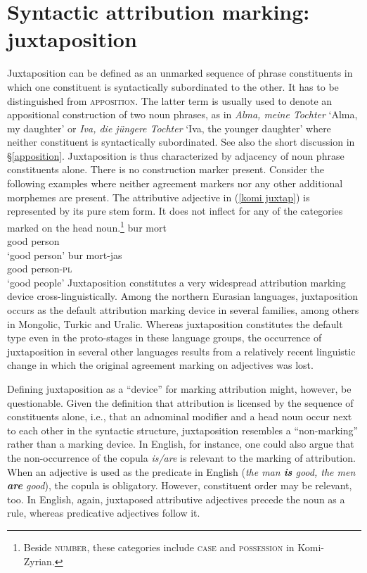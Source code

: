 \section[Juxtaposition]{Syntactic attribution marking: juxtaposition}
\label{juxtaposition}
Juxtaposition can be defined as an unmarked sequence of phrase constituents in which one constituent is syntactically subordinated to the other. It has to be distinguished from \textsc{apposition}. The latter term is usually used to denote an appositional construction of two noun phrases, as in \textit{Alma, meine Tochter} ‘Alma, my daughter’ or \textit{Iva, die jüngere Tochter} ‘Iva, the younger daughter’ where neither constituent is syntactically subordinated. See also the short discussion in \S\ref{apposition}. Juxtaposition is thus characterized by adjacency of noun phrase constituents alone. There is no construction marker present. Consider the following  examples where neither agreement markers nor any other additional morphemes are present. The attributive adjective in (\ref{komi juxtap}) is represented by its pure stem form. It does not inflect for any of the categories marked on the head noun.\footnote{Beside \textsc{number}, these categories include \textsc{case} and \textsc{possession} in Komi-Zyrian.}
\ea
\label{komi juxtap}
\ea
\gll 	bur 	mort\\
		good	person\\
\glt		‘good person’
\ex
\gll 	bur	mort-jas\\
		good	person-\textsc{pl}\\
\glt		‘good people’
\z
\z
Juxtaposition constitutes a very widespread attribution marking device cross-linguistically. Among the northern Eurasian languages, juxtaposition occurs as the default attribution marking device in several families, among others in Mongolic, Turkic and Uralic. Whereas juxtaposition constitutes the default type even in the proto-stages in these language groups, the occurrence of juxtaposition in several other languages results from a relatively recent linguistic change in which the original agreement marking on adjectives was lost.

Defining juxtaposition as a “device” for marking attribution might, however, be questionable. Given the definition that attribution is licensed by the sequence of constituents alone, i.e., that an adnominal modifier and a head noun occur next to each other in the syntactic structure, juxtaposition resembles a “non-marking” rather than a marking device. In English, for instance, one could also argue that the non-occurrence of the copula \textit{is\slash{}are} is relevant to the marking of attribution. When an adjective is used as the predicate in English (\textit{the man \textbf{is} good, the men \textbf{are} good}), the copula is obligatory. However, constituent order may be relevant, too. In English, again, juxtaposed attributive adjectives precede the noun as a rule, whereas predicative adjectives follow it. 

